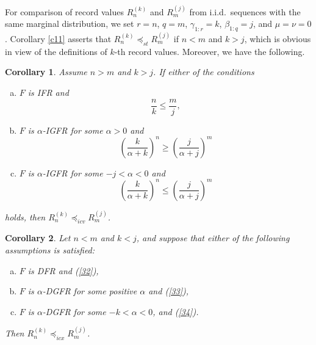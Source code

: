 \documentclass [11pt]{article}
\newtheorem{corollary}{Corollary}
\begin{document}
For comparison of record values $R_n^{(k)}$ and $R_m^{(j)}$ from i.i.d.\ sequences with the same marginal distribution, we set $r=n$, $q=m$, $\gamma_{1:r}=k$, $\beta_{1:q}=j$, and $\mu=\nu =0$.
Corollary \ref{c11} asserts that $R_n^{(k)} \preceq_{st}R_m^{(j)}$ if $n<m$ and $k>j$, which is obvious in view of the definitions of  $k$-th record values.
Moreover, we have the following.
\begin{corollary}
\label{cor1}
Assume $n>m$ and $k>j$. If either of the conditions
    \begin{enumerate}[(a)]
    \item
    $F$ is IFR and
    \begin{equation}
    \frac{n}{k} \leq \frac{m}{j},
    \label{32}
    \end{equation}

    \item
    $F$ is $\alpha$-IGFR for some $\alpha >0$ and
    \begin{equation}
    \label{33}
    \left( \frac{k}{\alpha+k} \right)^n \geq \left( \frac{j}{\alpha+j} \right)^m
    \end{equation}

    \item
    $F$ is $\alpha$-IGFR for some $-j < \alpha <0$ and
    \begin{equation}
    \label{34}
    \left( \frac{k}{\alpha+k} \right)^n \leq \left( \frac{j}{\alpha+j} \right)^m
    \end{equation}
    \end{enumerate}
holds, then $R_n^{(k)} \preceq_{icv} R_m^{(j)}$.
\end{corollary}


{\samepage
\begin{corollary}\label{cor2}
Let $n<m$ and $k<j$, and suppose that either of the following assumptions is satisfied:
    \begin{enumerate}[(a)]
    \item $F$ is DFR and (\ref{32}),
    \item $F$ is $\alpha$-DGFR for some positive $\alpha$ and (\ref{33}),
    \item $F$ is $\alpha$-DGFR for some $-k < \alpha <0$, and (\ref{34}).
    \end{enumerate}
Then $R_n^{(k)} \preceq_{icx} R_m^{(j)}$.
\end{corollary}
}
\end{document}
